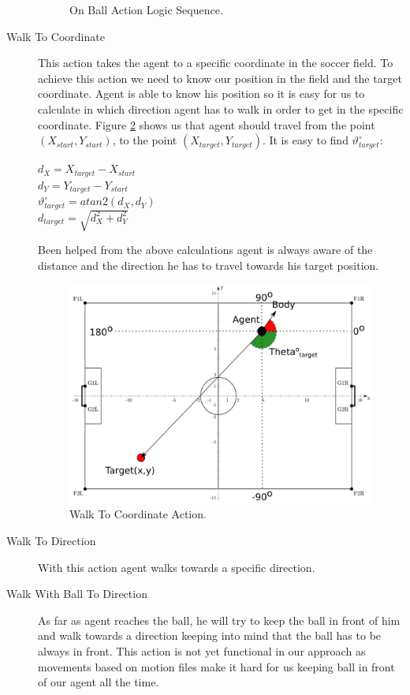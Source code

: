 \begin{description}
\begin{figure}[!h]
  \caption{On Ball Action Logic Sequence.}
  \label{fig:GoKickBallToGoal}
\end{figure}
 \item[Walk To Coordinate]
 This action takes the agent to a specific coordinate in the soccer field. To achieve this action we need to know our position in the field and the target coordinate. Agent is able to know his position so it is easy for us to calculate in which direction agent has to walk in order to get in the specific coordinate. Figure \ref{fig:WalkToCoordinate} shows us that agent should travel from the point $(X_{start},Y_{start})$, to the point $(X_{target},Y_{target})$. It is easy to find $\vartheta_{target}^{\circ}$:\\
\begin{center}
$d_{X} = X_{target} - X_{start}$\\
$d_{Y} = Y_{target} - Y_{start}$\\
$\vartheta_{target}^{\circ} = atan2(d_{X},d_{Y})$\\
$d_{target} = \sqrt{d_{X}^2 + d_{Y}^2}$
\end{center}

Been helped from the above calculations agent is always aware of the distance and the direction he has to travel towards his target position. 
 \begin{figure}[!h]
\centering
  \includegraphics[scale=0.6]{Chapter3/figures/GoToPos.pdf}
  \caption{Walk To Coordinate Action.}
  \label{fig:WalkToCoordinate}
\end{figure}
 \item[Walk To Direction]
 With this action agent walks towards a specific direction.
 \item[Walk With Ball To Direction]
 As far as agent reaches the ball, he will try to keep the ball in front of him and walk towards a direction keeping into mind that the ball has to be always in front. This action is not yet functional in our approach as movements based on motion files make it hard for us keeping ball in front of our agent all the time.
\end{description}

